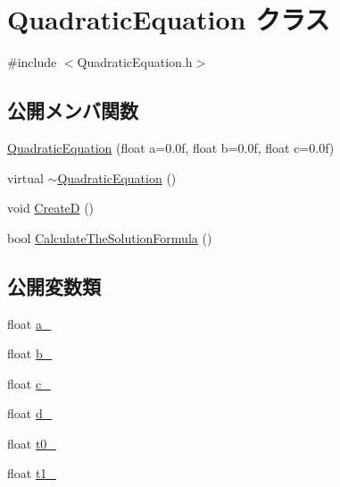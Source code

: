 \hypertarget{class_quadratic_equation}{}\section{Quadratic\+Equation クラス}
\label{class_quadratic_equation}


{\ttfamily \#include $<$Quadratic\+Equation.\+h$>$}

\subsection*{公開メンバ関数}
\begin{DoxyCompactItemize}
\item 
\mbox{\hyperlink{class_quadratic_equation_aa95741ece4499500c45925207c175aa6}{Quadratic\+Equation}} (float a=0.\+0f, float b=0.\+0f, float c=0.\+0f)
\item 
virtual \mbox{\hyperlink{class_quadratic_equation_a16dcf4de9fb30312e2d5b19c9e30eb00}{$\sim$\+Quadratic\+Equation}} ()
\item 
void \mbox{\hyperlink{class_quadratic_equation_a52f73bed0b665bcf3ab827630b999762}{CreateD}} ()
\item 
bool \mbox{\hyperlink{class_quadratic_equation_a624a3c6bb7b1cb741cba0b715075e2ed}{Calculate\+The\+Solution\+Formula}} ()
\end{DoxyCompactItemize}
\subsection*{公開変数類}
\begin{DoxyCompactItemize}
\item 
float \mbox{\hyperlink{class_quadratic_equation_ac12480b2ea372fab869fc304dd11a235}{a\+\_\+}}
\item 
float \mbox{\hyperlink{class_quadratic_equation_a874a04dff517be713157e6e97cb5512e}{b\+\_\+}}
\item 
float \mbox{\hyperlink{class_quadratic_equation_a314d9dfa7280b19c190f3e63747c82ae}{c\+\_\+}}
\item 
float \mbox{\hyperlink{class_quadratic_equation_a1fe06575641054bdf707bc2c6321a91d}{d\+\_\+}}
\item 
float \mbox{\hyperlink{class_quadratic_equation_a102647b71fef766fdebc1e86f0d1e1c5}{t0\+\_\+}}
\item 
float \mbox{\hyperlink{class_quadratic_equation_a1a8b4074a16fccdc3d717b4baa9d133e}{t1\+\_\+}}
\end{DoxyCompactItemize}


